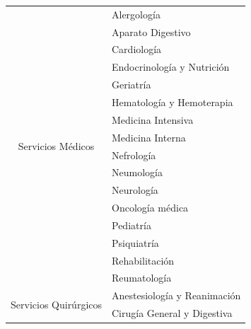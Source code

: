 \begin{table}[H]
    \centering
    \begin{tabular}{cl}
        \toprule
        \multirow{16}{*}{Servicios Médicos}                 & Alergología                          \\
                                                            & Aparato Digestivo                    \\
                                                            & Cardiología                          \\
                                                            & Endocrinología y Nutrición           \\
                                                            & Geriatría                            \\
                                                            & Hematología y Hemoterapia            \\
                                                            & Medicina Intensiva                   \\
                                                            & Medicina Interna                     \\
                                                            & Nefrología                           \\
                                                            & Neumología                           \\
                                                            & Neurología                           \\
                                                            & Oncología médica                     \\
                                                            & Pediatría                            \\
                                                            & Psiquiatría                          \\
                                                            & Rehabilitación                       \\
                                                            & Reumatología                         \\
        \midrule
        \multirow{10}{*}{Servicios   Quirúrgicos}           & Anestesiología y Reanimación         \\
                                                            & Cirugía General y Digestiva          \\

\end{tabular}
\end{table}
